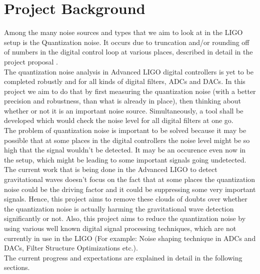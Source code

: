 \documentclass[colorlinks=true,pdfstartview=FitV,linkcolor=blue,
            citecolor=red,urlcolor=magenta]{ligodoc}
\begin{document}
\section{Project Background}
Among the many noise sources and types that we aim to look at in the LIGO setup is the Quantization noise. It occurs due to truncation and/or rounding off of numbers in the digital control loop at various places, described in detail in the project proposal \cite{ProjectProposal}. \\
The quantization noise analysis in Advanced LIGO digital controllers is yet to be completed robustly and for all kinds of digital filters, ADCs and DACs. In this project we aim to do that by first measuring the quantization noise (with a better precision and robustness, than what is already in place), then thinking about whether or not it is an important noise  source. Simultaneously, a tool shall be developed which would check the noise level for all digital filters at one go. \\ 
The problem of quantization noise is important to be solved because it may be possible that at some places in the digital controllers the noise level might be so high that the signal wouldn't be detected. It may be an occurence even now in the setup, which might be leading to some important signals going undetected. The current work that is being done in the Advanced LIGO to detect gravitational waves doesn't focus on the fact that at some places the quantization noise could be the driving factor and it could be suppressing some very important signals. Hence, this project aims to remove these clouds of doubts over whether the quantization noise is actually harming the gravitational wave detection significantly or not. Also, this project aims to reduce the quantization noise by using various well known digital signal processing techniques, which are not currently in use in the LIGO (For example: Noise shaping technique in ADCs and DACs, Filter Structure Optimizations etc.).   
\\
The current progress and expectations are explained in detail in the following sections.
\end{document}
